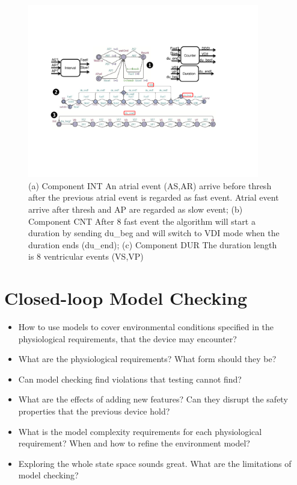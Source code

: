 \begin{figure}
		\centering
		\includegraphics[width=0.9\textwidth]{figs/duration.pdf}
		\vspace{-10pt}
		\caption{\small (a) Component \textsf{INT} An atrial event (\textsf{AS,AR}) arrive before \textsf{thresh} after the previous atrial event is regarded as \textsf{fast} event. Atrial event arrive after \textsf{thresh} and \textsf{AP} are regarded as \textsf{slow} event; (b) Component \textsf{CNT} After 8 \textsf{fast} event the algorithm will start a duration by sending \textsf{du\_beg} and will switch to \textsf{VDI} mode when the duration ends (\textsf{du\_end}); (c) Component \textsf{DUR} The duration length is 8 ventricular events (\textsf{VS,VP})}
		\label{fig:dur_count}
\end{figure} 

\chapter{Closed-loop Model Checking}
\begin{itemize}
	\item How to use models to cover environmental conditions specified in the physiological requirements, that the device may encounter?
            \item What are the physiological requirements? What form should they be?
            \item Can model checking find violations that testing cannot find?
            \item What are the effects of adding new features? Can they disrupt the safety properties that the previous device hold?
            \item What is the model complexity requirements for each physiological requirement? When and how to refine the environment model?
            \item Exploring the whole state space sounds great. What are the limitations of model checking? 
\end{itemize}

